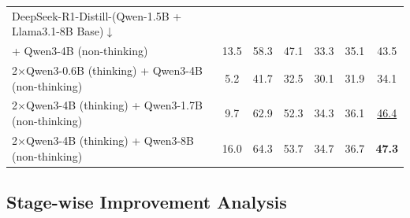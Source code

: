 \documentclass[sigconf]{aamas}
\begin{document}
\begin{table}[h!]
\begin{tabular}{lcccccc}
DeepSeek-R1-Distill-(Qwen-1.5B + Llama3.1-8B Base)$\downarrow$\\\quad + Qwen3-4B (non-thinking)& 13.5 & 58.3 & 47.1 & 33.3 & 35.1 & 43.5 \\
2$\times$Qwen3-0.6B (thinking) + Qwen3-4B (non-thinking)                                & 5.2  & 41.7 & 32.5 & 30.1 & 31.9 & 34.1 \\
2$\times$Qwen3-4B (thinking) + Qwen3-1.7B (non-thinking)                                & 9.7  & 62.9 & 52.3 & 34.3 & 36.1 & \underline{46.4} \\
2$\times$Qwen3-4B (thinking) + Qwen3-8B (non-thinking)                                  & 16.0 & 64.3 & 53.7 & 34.7 & 36.7 & \textbf{47.3} \\
\bottomrule
\end{tabular}
\end{table}

\subsection{Stage-wise Improvement Analysis}
\end{document}
